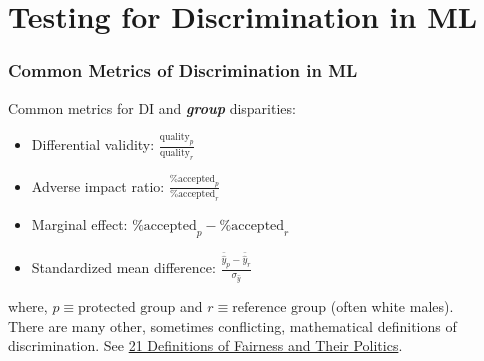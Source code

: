 \documentclass[11pt,aspectratio=169,hyperref={colorlinks}]{beamer}
\begin{document}
	\section{Testing for Discrimination in ML}

		\begin{frame}				
		
			\frametitle{Common Metrics of Discrimination in ML}
			
			Common metrics for DI and \textbf{\textit{group}} disparities:\\
			\begin{itemize}
				\item Differential validity: $\frac{\text{quality}_p}{\text{quality}_r}$
				\item Adverse impact ratio: $\frac{\text{\% accepted}_p }{ \text{\% accepted}_r}$ 
				\item Marginal effect: $\text{\% accepted}_p - \text{\% accepted}_r$
				\item Standardized mean difference: $\frac{\bar{\hat{y}}_p - \bar{\hat{y}}_r}{\sigma_{\hat{y}}}$
			\end{itemize}
			\noindent 
			\scriptsize{where, $p \equiv \text{protected group}$ and $r \equiv \text{reference group}$ (often white males).}\\
			\vspace{5pt}
			\normalsize{There are many other, sometimes conflicting, mathematical definitions of discrimination. 
				See \href{https://www.youtube.com/watch?v=wqamrPkF5kk}{21 Definitions of Fairness and Their Politics}.}
			
		\end{frame}
	
\end{document}
